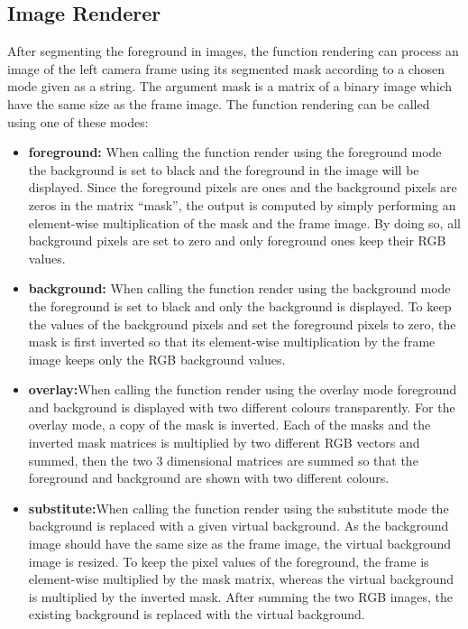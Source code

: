 \subsection{Image Renderer}
After segmenting the foreground in images, the function rendering can process an image of the left camera frame using its segmented mask according to a chosen mode given as a string. The argument mask is a matrix of a binary image which have the same size as the frame image. The function rendering can be called using one of these modes:
\\
\begin{itemize}
	\item \textbf{foreground:} When calling the function render using the foreground mode the background is set to black and the foreground in the image will be displayed. Since the foreground pixels are ones and the background pixels are zeros in the matrix “mask”, the output is computed by simply performing an element-wise multiplication of the mask and the frame image. By doing so, all background pixels are set to zero and only foreground ones keep their RGB values.
	\item \textbf{background:} When calling the function render using the background mode the foreground is set to black and only the background is displayed. To keep the values of the background pixels and set the foreground pixels to zero, the mask is first inverted so that its element-wise multiplication by the frame image keeps only the RGB background values.
	\item \textbf{overlay:}When calling the function render using the overlay mode foreground and background is displayed with two different colours transparently. For the overlay mode, a copy of the mask is inverted. Each of the masks and the inverted mask matrices is multiplied by two different RGB vectors and summed, then the two 3 dimensional matrices are summed so that the foreground and background are shown with two different colours.
	\item \textbf{substitute:}When calling the function render using the substitute mode the background is replaced with a given virtual background. As the background image should have the same size as the frame image, the virtual background image is resized. To keep the pixel values of the foreground, the frame is element-wise multiplied by the mask matrix, whereas the virtual background is multiplied by the inverted mask. After summing the two RGB images, the existing background is replaced with the virtual background.
\end{itemize}